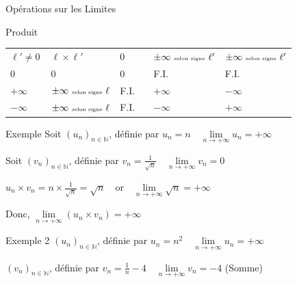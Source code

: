 \documentclass{coursbook}
\begin{document}
\begin{Gpartie}{Opérations sur les Limites}
\begin{Spartie}{Produit}
\begin{table}[H]
{\begin{tabular}{ p{0.15\linewidth} *{4}{M{0.17\linewidth} }}
                        $\ell'\neq0$& $\ell\times\ell'$                             & $0$ & $\pm\infty~\text{\tiny{selon signe}}~\ell'$ & $\pm\infty~\text{\tiny{selon signe}}~\ell'$   \\
                        $0$         & $0$                                           & $0$ & F.I.                                        & F.I.                                          \\
                        $+\infty$   & $\pm\infty~\text{\tiny{selon signe}}~\ell$    & F.I.& $+\infty$                                   & $-\infty$                                     \\
                        $-\infty$   & $\pm\infty~\text{\tiny{selon signe}}~\ell$    & F.I.& $-\infty$                                   & $+\infty$                                     \\ \bottomrule
                    \end{tabular}
                }
            \end{table}
            \begin{SSpartie}{Exemple} 
                Soit $(u_n)_{n\in\mathbb{N}}$, définie par $u_n=n\quad\lim\limits_{n\to +\infty}u_n=+\infty$

                Soit $(v_n)_{n\in\mathbb{N}}$, définie par $v_n=\frac{1}{\sqrt{n}}\quad\lim\limits_{n\to +\infty}v_n=0$

                $u_n\times v_n=n\times\frac{1}{\sqrt{n}}=\sqrt{n}\quad\text{or}\quad\lim\limits_{n\to +\infty}\sqrt{n}=+\infty$

                Donc, $\lim\limits_{n\to +\infty}(u_n\times v_n)=+\infty$
            \end{SSpartie}
            \begin{SSpartie}{Exemple 2} 
                $(u_n)_{n\in\mathbb{N}}$, définie par $u_n=n^2\quad\lim\limits_{n\to +\infty}u_n=+\infty$

                $(v_n)_{n\in\mathbb{N}}$, définie par $v_n=\frac{1}{n}-4\quad\lim\limits_{n\to +\infty}v_n=-4$ (Somme)


\end{SSpartie}
\end{Spartie}
\end{Gpartie}
\end{document}
